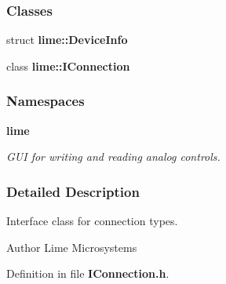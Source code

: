 \subsubsection*{Classes}
\begin{DoxyCompactItemize}
\item 
struct {\bf lime\+::\+Device\+Info}
\item 
class {\bf lime\+::\+I\+Connection}
\end{DoxyCompactItemize}
\subsubsection*{Namespaces}
\begin{DoxyCompactItemize}
\item 
 {\bf lime}
\begin{DoxyCompactList}\small\item\em G\+UI for writing and reading analog controls. \end{DoxyCompactList}\end{DoxyCompactItemize}


\subsubsection{Detailed Description}
Interface class for connection types. 

\begin{DoxyAuthor}{Author}
Lime Microsystems 
\end{DoxyAuthor}


Definition in file {\bf I\+Connection.\+h}.

